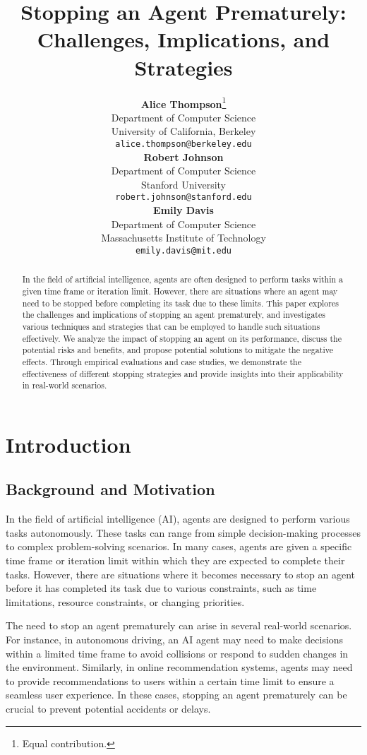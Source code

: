 \documentclass{article}
\title{Stopping an Agent Prematurely: Challenges, Implications, and Strategies}
\author{
  \textbf{Alice Thompson}\thanks{Equal contribution.} \\
  Department of Computer Science\\
  University of California, Berkeley\\
  \texttt{alice.thompson@berkeley.edu} \\
  \And
  \textbf{Robert Johnson}\footnotemark[1] \\
  Department of Computer Science\\
  Stanford University\\
  \texttt{robert.johnson@stanford.edu} \\
  \And
  \textbf{Emily Davis} \\
  Department of Computer Science\\
  Massachusetts Institute of Technology\\
  \texttt{emily.davis@mit.edu} \\
}
\begin{document}
\maketitle

\begin{abstract}
In the field of artificial intelligence, agents are often designed to perform tasks within a given time frame or iteration limit. However, there are situations where an agent may need to be stopped before completing its task due to these limits. This paper explores the challenges and implications of stopping an agent prematurely, and investigates various techniques and strategies that can be employed to handle such situations effectively. We analyze the impact of stopping an agent on its performance, discuss the potential risks and benefits, and propose potential solutions to mitigate the negative effects. Through empirical evaluations and case studies, we demonstrate the effectiveness of different stopping strategies and provide insights into their applicability in real-world scenarios.
\end{abstract}

\section{Introduction}

\subsection{Background and Motivation}

In the field of artificial intelligence (AI), agents are designed to perform various tasks autonomously. These tasks can range from simple decision-making processes to complex problem-solving scenarios. In many cases, agents are given a specific time frame or iteration limit within which they are expected to complete their tasks. However, there are situations where it becomes necessary to stop an agent before it has completed its task due to various constraints, such as time limitations, resource constraints, or changing priorities.

The need to stop an agent prematurely can arise in several real-world scenarios. For instance, in autonomous driving, an AI agent may need to make decisions within a limited time frame to avoid collisions or respond to sudden changes in the environment. Similarly, in online recommendation systems, agents may need to provide recommendations to users within a certain time limit to ensure a seamless user experience. In these cases, stopping an agent prematurely can be crucial to prevent potential accidents or delays.
\end{document}
